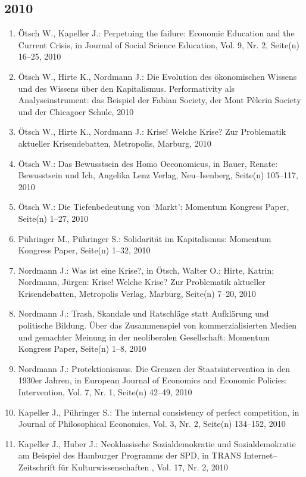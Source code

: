 \subsection*{2010}
\begin{enumerate}
    	 \item Ötsch W., Kapeller J.: Perpetuing the failure: Economic Education and the Current Crisis, in Journal of Social Science Education, Vol. 9, Nr. 2, Seite(n) 16--25, 2010
	 \item Ötsch W., Hirte K., Nordmann J.: Die Evolution des ökonomischen Wissens und des Wissens über den Kapitalismus. Performativity als Analyseinstrument: das Beispiel der Fabian Society, der Mont Pèlerin Society und der Chicagoer Schule, 2010
	 \item Ötsch W., Hirte K., Nordmann J.: Krise! Welche Krise? Zur Problematik aktueller Krisendebatten, Metropolis, Marburg, 2010
	 \item Ötsch W.: Das Bewusstsein des Homo Oeconomicus, in Bauer, Renate: Bewusstsein und Ich, Angelika Lenz Verlag, Neu--Isenberg, Seite(n) 105–117, 2010
	 \item Ötsch W.: Die Tiefenbedeutung von ‘Markt’: Momentum Kongress Paper, Seite(n) 1--27, 2010
	 \item Pühringer M., Pühringer S.: Solidarität im Kapitalismus: Momentum Kongress Paper, Seite(n) 1--32, 2010
	 \item Nordmann J.: Was ist eine Krise?, in Ötsch, Walter O.; Hirte, Katrin; Nordmann, Jürgen: Krise! Welche Krise? Zur Problematik aktueller Krisendebatten, Metropolis Verlag, Marburg, Seite(n) 7--20, 2010
	 \item Nordmann J.: Trash, Skandale und Ratschläge statt Aufklärung und politische Bildung. Über das Zusammenspiel von kommerzialisierten Medien und gemachter Meinung in der neoliberalen Gesellschaft: Momentum Kongress Paper, Seite(n) 1--8, 2010
	 \item Nordmann J.: Protektionismus. Die Grenzen der Staatsintervention in den 1930er Jahren, in European Journal of Economics and Economic Policies: Intervention, Vol. 7, Nr. 1, Seite(n) 42--49, 2010
	 \item Kapeller J., Pühringer S.: The internal consistency of perfect competition, in Journal of Philosophical Economics, Vol. 3, Nr. 2, Seite(n) 134--152, 2010
	 \item Kapeller J., Huber J.: Neoklassische Sozialdemokratie und Sozialdemokratie am Beispiel des Hamburger Programms der SPD, in TRANS Internet--Zeitschrift für Kulturwissenschaften , Vol. 17, Nr. 2, 2010

\end{enumerate}
